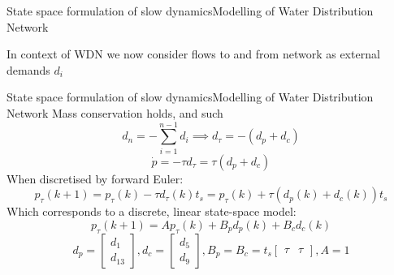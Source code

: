 \begin{frame}{State space formulation of slow dynamics}{Modelling of Water Distribution Network}
	\begin{figure}[h!]
		\centering
		\resizebox{\columnwidth}{!}{
			}
		\label{fig:tikzWDNGraph}
	\end{figure}  
	In context of WDN we now consider flows to and from network as external demands $ d_i $
\end{frame}

\begin{frame}{State space formulation of slow dynamics}{Modelling of Water Distribution Network}
	Mass conservation holds, and such
	\begin{equation*}
		d_n = -\sum_{i=1}^{n-1}d_i \implies d_\tau = - (d_p + d_c)
	\end{equation*}
	\begin{equation*}
		\dot{p} = -\tau d_\tau = \tau (d_p + d_c)
	\end{equation*}	
	When discretised by forward Euler:
	\begin{equation*}
		p_\tau(k+1) = p_\tau(k) - \tau d_\tau(k) t_s = p_\tau(k) + \tau(d_p(k) + d_c(k)) t_s
	\end{equation*}
	Which corresponds to a discrete, linear state-space model:
	\begin{equation}
		p_\tau(k+1) = Ap_\tau(k) + B_pd_p(k) + B_cd_c(k)
	\end{equation}
	\begin{equation*}
		d_p = \begin{bmatrix}
			d_1 \\ d_{13}
		\end{bmatrix},
		d_c = \begin{bmatrix}
			d_5 \\ d_9
		\end{bmatrix},
		B_p = B_c = t_s  \begin{bmatrix}
			\tau & \tau
		\end{bmatrix},
		A = 1
	\end{equation*}
\end{frame}



